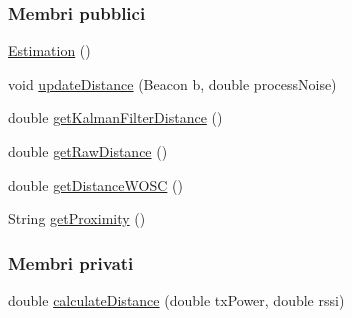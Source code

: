 \subsubsection*{Membri pubblici}
\begin{DoxyCompactItemize}
\item 
\hyperlink{classit_1_1unibo_1_1torsello_1_1bluetoothpositioning_1_1distanceEstimation_1_1Estimation_abd84ded1e26d40304606ce0572735106_abd84ded1e26d40304606ce0572735106}{Estimation} ()
\item 
void \hyperlink{classit_1_1unibo_1_1torsello_1_1bluetoothpositioning_1_1distanceEstimation_1_1Estimation_aaf86439861db7facf3f5338ec2fc6cde_aaf86439861db7facf3f5338ec2fc6cde}{update\+Distance} (Beacon b, double process\+Noise)
\item 
double \hyperlink{classit_1_1unibo_1_1torsello_1_1bluetoothpositioning_1_1distanceEstimation_1_1Estimation_a985e9b8b61c3d1e917a2e818b5f8b679_a985e9b8b61c3d1e917a2e818b5f8b679}{get\+Kalman\+Filter\+Distance} ()
\item 
double \hyperlink{classit_1_1unibo_1_1torsello_1_1bluetoothpositioning_1_1distanceEstimation_1_1Estimation_ad355b2e850a8d6013ef771eecd740e1b_ad355b2e850a8d6013ef771eecd740e1b}{get\+Raw\+Distance} ()
\item 
double \hyperlink{classit_1_1unibo_1_1torsello_1_1bluetoothpositioning_1_1distanceEstimation_1_1Estimation_a5c7bce21cd77c98a8d1e6df4c930397c_a5c7bce21cd77c98a8d1e6df4c930397c}{get\+Distance\+W\+O\+SC} ()
\item 
String \hyperlink{classit_1_1unibo_1_1torsello_1_1bluetoothpositioning_1_1distanceEstimation_1_1Estimation_a2edfb9f301730647277474c61b41dbd5_a2edfb9f301730647277474c61b41dbd5}{get\+Proximity} ()
\end{DoxyCompactItemize}
\subsubsection*{Membri privati}
\begin{DoxyCompactItemize}
\item 
double \hyperlink{classit_1_1unibo_1_1torsello_1_1bluetoothpositioning_1_1distanceEstimation_1_1Estimation_a6e33d4e0b776517a86c6aa87cd51b66b_a6e33d4e0b776517a86c6aa87cd51b66b}{calculate\+Distance} (double tx\+Power, double rssi)
\end{DoxyCompactItemize}
